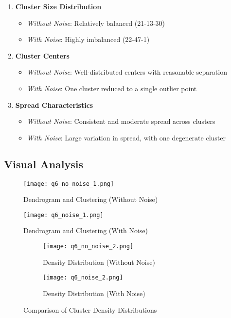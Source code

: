\documentclass[12pt]{article}
\begin{document}
\begin{enumerate}
    \item \textbf{Cluster Size Distribution}
    \begin{itemize}
        \item \textit{Without Noise}: Relatively balanced (21-13-30)
        \item \textit{With Noise}: Highly imbalanced (22-47-1)
    \end{itemize}
    
    \item \textbf{Cluster Centers}
    \begin{itemize}
        \item \textit{Without Noise}: Well-distributed centers with reasonable separation
        \item \textit{With Noise}: One cluster reduced to a single outlier point
    \end{itemize}
    
    \item \textbf{Spread Characteristics}
    \begin{itemize}
        \item \textit{Without Noise}: Consistent and moderate spread across clusters
        \item \textit{With Noise}: Large variation in spread, with one degenerate cluster
    \end{itemize}
\end{enumerate}

\subsection{Visual Analysis}


\begin{figure}[H]
    \texttt{[image: q6\_no\_noise\_1.png]}
    \caption{Dendrogram and Clustering (Without Noise)}
\end{figure}
\begin{figure}[H]
    \texttt{[image: q6\_noise\_1.png]}
    \caption{Dendrogram and Clustering (With Noise)}
\end{figure}

\begin{figure}[H]
    \centering
    \begin{subfigure}[b]{0.48\textwidth}
        \texttt{[image: q6\_no\_noise\_2.png]}
        \caption{Density Distribution (Without Noise)}
    \end{subfigure}
    \hfill
    \begin{subfigure}[b]{0.48\textwidth}
        \texttt{[image: q6\_noise\_2.png]}
        \caption{Density Distribution (With Noise)}
    \end{subfigure}
    \caption{Comparison of Cluster Density Distributions}
\end{figure}
\end{document}
